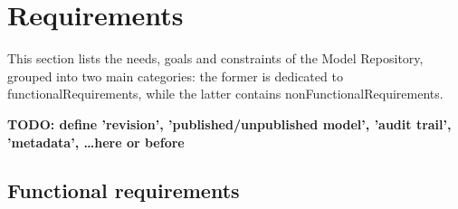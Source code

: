 \section{Requirements}
\label{requirements}
This section lists the needs, goals and constraints of the \ddmore Model Repository, grouped into two main categories: the former is dedicated to \glspl{functionalRequirement}, while the latter contains \glspl{nonFunctionalRequirement}. 




\textbf{TODO: define 'revision', 'published/unpublished model', 'audit trail', 'metadata', \dots here or before}



\subsection{Functional requirements}
\label{functionalRequirements}

